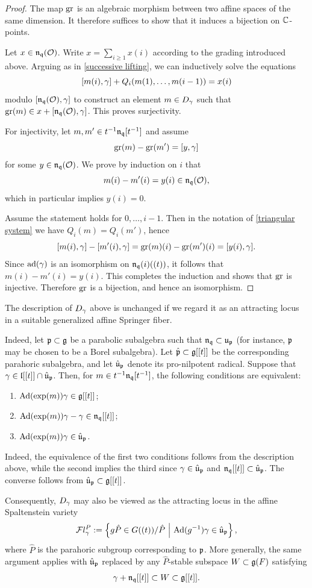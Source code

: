 \documentclass[11pt]{article}
\numberwithin{equation}{section}
\begin{document}
\begin{proof}
The map $\operatorname{gr}$ is an algebraic morphism between two affine spaces of the same dimension. 
It therefore suffices to show that it induces a bijection on $\mathbb{C}$-points.

Let $x\in \mathfrak{n}_{\mathfrak{q}}(\mathcal{O})$.
Write $x=\sum_{i\geqslant 1} x(i)$ according to the grading introduced above.
Arguing as in \cref{successive lifting}, we can inductively solve the equations
\[
[m(i),\gamma] + Q_i(m(1),\dots,m(i-1)) = x(i)
\]
modulo $[\mathfrak{n}_{\mathfrak{q}}(\mathcal{O}),\gamma]$ to construct an element $m\in D_\gamma$ such that $\operatorname{gr}(m)\in x+[\mathfrak{n}_{\mathfrak{q}}(\mathcal{O}),\gamma]$. This proves surjectivity.

For injectivity, let $m,m'\in t^{-1}\mathfrak{n}_{\mathfrak{q}}[t^{-1}]$ and assume
\[
\operatorname{gr}(m)-\operatorname{gr}(m')=[y,\gamma]
\]
for some $y\in \mathfrak{n}_{\mathfrak{q}}(\mathcal{O})$.
We prove by induction on $i$ that
\[
m(i)-m'(i)=y(i)\in \mathfrak{n}_{\mathfrak{q}}(\mathcal{O}),
\]
which in particular implies $y(i)=0$.

Assume the statement holds for $0,\dots,i-1$.
Then in the notation of \cref{triangular system} we have
$Q_i(m)=Q_i(m')$, hence
\[
[m(i),\gamma]-[m'(i),\gamma]=\operatorname{gr}(m)(i)- \operatorname{gr}(m')(i)=[y(i),\gamma].
\]
Since $\operatorname{ad}(\gamma)$ is an isomorphism on $\mathfrak{n}_{\mathfrak{q}}(i)((t))$, it follows that $m(i)-m'(i)=y(i)$. This completes the induction and shows that $\operatorname{gr}$ is injective. Therefore $\operatorname{gr}$ is a bijection, and hence an isomorphism.
\end{proof}
\begin{rem}\label{attracting locus in generalized asf}
The description of $D_\gamma$ above is unchanged if we regard it as an
attracting locus in a suitable generalized affine Springer fiber.

Indeed, let $\mathfrak{p}\subset\mathfrak{g}$ be a parabolic subalgebra such that
$\mathfrak{n}_{\mathfrak{q}}\subset\mathfrak{u}_{\mathfrak{p}}$ (for instance, $\mathfrak{p}$ may be chosen to be a Borel
subalgebra). Let $\hat{\mathfrak{p}}\subset\mathfrak{g}[[t]]$ be the corresponding parahoric
subalgebra, and let $\hat{\mathfrak{u}}_{\mathfrak{p}}$ denote its pro-nilpotent radical.
Suppose that $\gamma\in\mathfrak{l}[[t]]\cap\hat{\mathfrak{u}}_{\mathfrak{p}}$. Then, for
$m\in t^{-1}\mathfrak{n}_{\mathfrak{q}}[t^{-1}]$, the following conditions are equivalent:
\begin{enumerate}
    \item $\operatorname{Ad}(\exp(m))\gamma\in\mathfrak{g}[[t]]$;
    \item $\operatorname{Ad}(\exp(m))\gamma-\gamma\in\mathfrak{n}_{\mathfrak{q}}[[t]]$;
    \item $\operatorname{Ad}(\exp(m))\gamma\in\hat{\mathfrak{u}}_{\mathfrak{p}}$.
\end{enumerate}
Indeed, the equivalence of the first two conditions follows from the
description above, while the second implies the third since
$\gamma\in\hat{\mathfrak{u}}_{\mathfrak{p}}$ and
$\mathfrak{n}_{\mathfrak{q}}[[t]]\subset\hat{\mathfrak{u}}_{\mathfrak{p}}$. The converse follows from
$\hat{\mathfrak{u}}_{\mathfrak{p}}\subset\mathfrak{g}[[t]]$.

Consequently, $D_\gamma$ may also be viewed as the attracting locus in the
affine Spaltenstein variety
\[
\mathcal{F}l_\gamma^P:= \left\{
g\hat P\in G((t))/\hat P
\ \middle|\
\operatorname{Ad}(g^{-1})\gamma\in\hat{\mathfrak{u}}_{\mathfrak{p}}
\right\},
\]
where $\hat P$ is the parahoric subgroup corresponding to $\mathfrak{p}$. More generally, the same argument applies with $\hat{\mathfrak{u}}_{\mathfrak{p}}$ replaced
by any $\hat P$-stable subspace $W\subset\mathfrak{g}(F)$ satisfying
\[
\gamma+\mathfrak{n}_{\mathfrak{q}}[[t]]\subset W\subset\mathfrak{g}[[t]].
\]
\end{rem}
\end{document}
